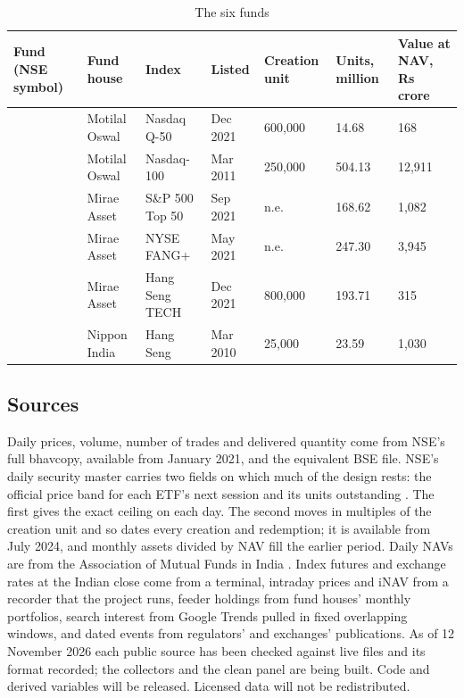 \begin{table}[!t]
\centering\small
\caption{The six funds}\label{tab:funds}
\begin{tabularx}{\textwidth}{L{2.25cm}L{2.1cm}YR{1.5cm}R{1.45cm}R{1.5cm}R{1.6cm}}
\toprule
Fund (NSE symbol) & Fund house & Index & Listed & Creation unit & Units, million & Value at NAV, Rs crore\\
\midrule
{} & Motilal Oswal & Nasdaq Q-50 & Dec 2021 & 600,000 & 14.68 & 168\\
 & Motilal Oswal & Nasdaq-100 & Mar 2011 & 250,000 & 504.13 & 12,911\\
 & Mirae Asset & S\&P 500 Top 50 & Sep 2021 & n.e. & 168.62 & 1,082\\
 & Mirae Asset & NYSE FANG+ & May 2021 & n.e. & 247.30 & 3,945\\
 & Mirae Asset & Hang Seng TECH & Dec 2021 & 800,000 & 193.71 & 315\\
 & Nippon India & Hang Seng & Mar 2010 & 25,000 & 23.59 & 1,030\\
\bottomrule
\end{tabularx}
\end{table}

\subsection{Sources}
Daily prices, volume, number of trades and delivered quantity come from NSE's full bhavcopy, available from January 2021, and the equivalent BSE file. NSE's daily security master carries two fields on which much of the design rests: the official price band for each ETF's next session and its units outstanding \citep{nse2026files}. The first gives the exact ceiling on each day. The second moves in multiples of the creation unit and so dates every creation and redemption; it is available from July 2024, and monthly assets divided by NAV fill the earlier period. Daily NAVs are from the Association of Mutual Funds in India \citep{amfi2026nav}. Index futures and exchange rates at the Indian close come from a terminal, intraday prices and iNAV from a recorder that the project runs, feeder holdings from fund houses' monthly portfolios, search interest from Google Trends pulled in fixed overlapping windows, and dated events from regulators' and exchanges' publications. As of 12 November 2026 each public source has been checked against live files and its format recorded; the collectors and the clean panel are being built. Code and derived variables will be released. Licensed data will not be redistributed.

